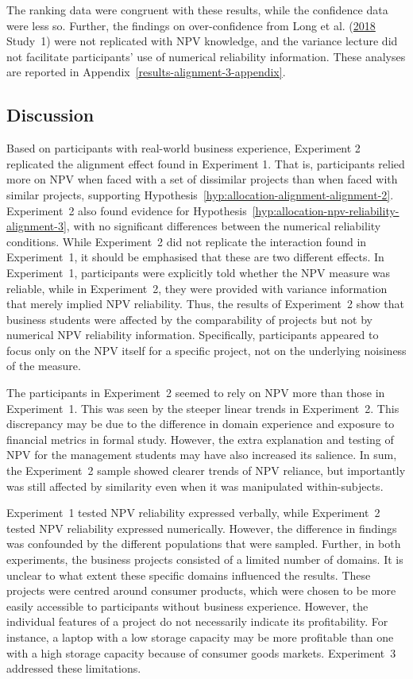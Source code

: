 \documentclass[
  english,
  man, donotrepeattitle,floatsintext]{apa7}
\theoremstyle{definition}
\theoremstyle{definition}
\theoremstyle{definition}
\theoremstyle{definition}
\theoremstyle{remark}
\begin{document}
The ranking data were congruent with these results, while the confidence data
were less so. Further, the findings on over-confidence from Long et al. (\protect\hyperlink{ref-long2018}{2018} Study~1)
were not replicated with NPV knowledge, and the variance lecture did not
facilitate participants' use of numerical reliability information. These
analyses are reported in Appendix~\ref{results-alignment-3-appendix}.

\hypertarget{discussion-1}{%
\subsection{Discussion}\label{discussion-1}}

Based on participants with real-world business experience, Experiment 2
replicated the alignment effect found in Experiment 1. That is, participants
relied more on NPV when faced with a set of dissimilar projects than when faced
with similar projects, supporting
Hypothesis~\ref{hyp:allocation-alignment-alignment-2}. Experiment~2 also found
evidence for Hypothesis~\ref{hyp:allocation-npv-reliability-alignment-3}, with
no significant differences between the numerical reliability conditions. While
Experiment~2 did not replicate the interaction found in Experiment~1, it should
be emphasised that these are two different effects. In Experiment~1,
participants were explicitly told whether the NPV measure was reliable, while in
Experiment~2, they were provided with variance information that merely implied
NPV reliability. Thus, the results of Experiment~2 show that business students
were affected by the comparability of projects but not by numerical NPV
reliability information. Specifically, participants appeared to focus only on
the NPV itself for a specific project, not on the underlying noisiness of the
measure.

The participants in Experiment~2 seemed to rely on NPV more than those in
Experiment~1. This was seen by the steeper linear trends in Experiment~2. This
discrepancy may be due to the difference in domain experience and exposure to
financial metrics in formal study. However, the extra explanation and testing of
NPV for the management students may have also increased its salience. In sum,
the Experiment~2 sample showed clearer trends of NPV reliance, but importantly
was still affected by similarity even when it was manipulated within-subjects.

Experiment~1 tested NPV reliability expressed verbally, while Experiment~2
tested NPV reliability expressed numerically. However, the difference in
findings was confounded by the different populations that were sampled. Further,
in both experiments, the business projects consisted of a limited number of
domains. It is unclear to what extent these specific domains influenced the
results. These projects were centred around consumer products, which were chosen
to be more easily accessible to participants without business experience.
However, the individual features of a project do not necessarily indicate its
profitability. For instance, a laptop with a low storage capacity may be more
profitable than one with a high storage capacity because of consumer goods
markets. Experiment~3 addressed these limitations.
\end{document}
